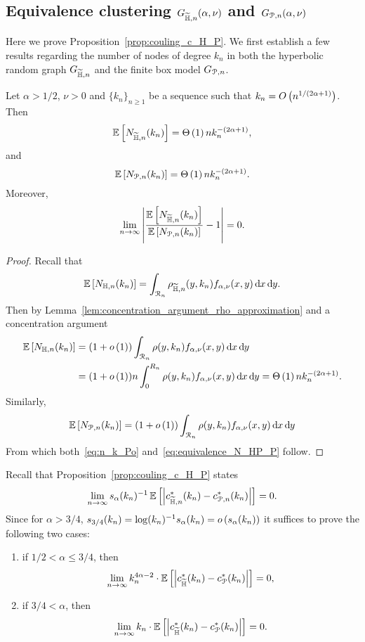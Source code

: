 \subsection{Equivalence clustering $G_{\widetilde{\mathbb{H}},n}(\alpha,\nu)$ and $G_{{\mathcal P},n}(\alpha,\nu)$}\label{ssec:coupling_HP_ast_P}


Here we prove Proposition~\ref{prop:couling_c_H_P}. We first establish a few results regarding the number of nodes of degree $k_n$ in both the  hyperbolic random graph $G_{\widetilde{\mathbb{H}},n}$ and the finite box model $G_{{\mathcal P},n}$.

\begin{lemma}\label{lem:N_k_HP_P}
Let $\alpha > 1/2$, $\nu > 0$ and $\{k_n\}_{n\ge 1}$ be a sequence such that $k_n = O\left(n^{1/(2\alpha + 1)}\right)$. Then
\begin{equation} \label{eq:n_k_Hyp}
	\mathbb{E}\left[N_{\widetilde{\mathbb{H}},n}(k_n)\right] = \Theta\left(1\right) n k_n^{-(2\alpha + 1)},
\end{equation}
and
\begin{equation} \label{eq:n_k_Po}
	\mathbb{E}\left[N_{{\mathcal P},n}(k_n)\right] = \Theta\left(1\right) n k_n^{-(2\alpha + 1)}.
\end{equation}
Moreover,
\begin{equation}\label{eq:equivalence_N_HP_P}
	\lim_{n \to \infty} \left|\frac{\mathbb{E}\left[N_{\widetilde{\mathbb{H}},n}(k_n)\right]}{\mathbb{E}\left[N_{{\mathcal P},n}(k_n)\right]} - 1\right| = 0.
\end{equation}
\end{lemma}

\begin{proof}
Recall that
\[
	\mathbb{E}\left[N_{\mathbb{H},n}(k_n)\right] = \int_{{\mathcal R}_n} \rho_{\widetilde{\mathbb{H}},n}(y,k_n) f_{\alpha,\nu}(x,y) \operatorname{\mathrm{d}\hspace{-2pt}} x \operatorname{\mathrm{d}\hspace{-2pt}} y. 
\]
Then by Lemma~\ref{lem:concentration_argument_rho_approximation} and a concentration argument 
\begin{align*}
	\mathbb{E}\left[N_{\mathbb{H},n}(k_n)\right] &= (1 + o\left(1\right))\int_{{\mathcal R}_n} \rho(y,k_n) f_{\alpha,\nu}(x,y) \operatorname{\mathrm{d}\hspace{-2pt}} x \operatorname{\mathrm{d}\hspace{-2pt}} y\\
	&= (1 + o\left(1\right)) n \int_{0}^{R_n} \rho(y,k_n) f_{\alpha,\nu}(x,y) \operatorname{\mathrm{d}\hspace{-2pt}} x \operatorname{\mathrm{d}\hspace{-2pt}} y = \Theta\left(1\right)n k_n^{-(2\alpha + 1)}.
\end{align*}
Similarly,
\[
	\mathbb{E}\left[N_{{\mathcal P},n}(k_n)\right] = (1 + o\left(1\right))\int_{{\mathcal R}_n} \rho(y,k_n) f_{\alpha,\nu}(x,y) \operatorname{\mathrm{d}\hspace{-2pt}} x \operatorname{\mathrm{d}\hspace{-2pt}} y
\]
From which both~\eqref{eq:n_k_Po} and~\eqref{eq:equivalence_N_HP_P} follow.
\end{proof}

Recall that Proposition~\ref{prop:couling_c_H_P} states
\[
	\lim_{n \to \infty} s_\alpha(k_n)^{-1} \, \mathbb{E}\left[\left|c_{\widetilde{\mathbb{H}},n}^\ast(k_n) - c_{{\mathcal P},n}^\ast(k_n)\right|\right] = 0.
\]
Since for $\alpha > 3/4$, $s_{3/4}(k_n) = \log(k_n)^{-1} s_{\alpha}(k_n) = o\left(s_{\alpha}(k_n)\right)$ it suffices to prove the following two cases:
\begin{enumerate}
\item if $1/2 < \alpha \leq 3/4$, then
\[
	\lim_{n\to \infty} k_n^{4\alpha -2}\cdot \mathbb{E}\left[\left|  c_{\widetilde{\mathbb{H}}}^\ast(k_n) - c_{{\mathcal P}}^\ast(k_n)\right|\right]=0,
\]
\item if $3/4 < \alpha$, then
\[ 
	\lim_{n\to \infty} k_n \cdot \mathbb{E}\left[\left|  c_{\widetilde{\mathbb{H}}}^\ast(k_n) - c_{{\mathcal P}}^\ast(k_n)\right|\right]=0.
\]
\end{enumerate}

